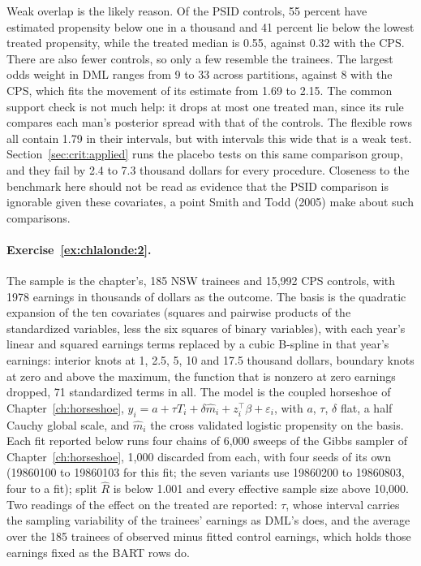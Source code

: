 Weak overlap is the likely reason. Of the PSID controls, 55 percent have estimated propensity below one in a thousand and 41 percent lie below the lowest treated propensity, while the treated median is 0.55, against 0.32 with the CPS. There are also fewer controls, so only a few resemble the trainees. The largest odds weight in DML ranges from 9 to 33 across partitions, against 8 with the CPS, which fits the movement of its estimate from 1.69 to 2.15. The common support check is not much help: it drops at most one treated man, since its rule compares each man's posterior spread with that of the controls. The flexible rows all contain 1.79 in their intervals, but with intervals this wide that is a weak test. Section~\ref{sec:crit:applied} runs the placebo tests on this same comparison group, and they fail by 2.4 to 7.3 thousand dollars for every procedure. Closeness to the benchmark here should not be read as evidence that the PSID comparison is ignorable given these covariates, a point Smith and Todd (2005) make about such comparisons.

\paragraph{Exercise~\ref{ex:chlalonde:2}.} The sample is the chapter's, 185 NSW trainees and 15,992 CPS controls, with 1978 earnings in thousands of dollars as the outcome. The basis is the quadratic expansion of the ten covariates (squares and pairwise products of the standardized variables, less the six squares of binary variables), with each year's linear and squared earnings terms replaced by a cubic B-spline in that year's earnings: interior knots at 1, 2.5, 5, 10 and 17.5 thousand dollars, boundary knots at zero and above the maximum, the function that is nonzero at zero earnings dropped, 71 standardized terms in all. The model is the coupled horseshoe of Chapter~\ref{ch:horseshoe}, $y_i = a + \tau T_i + \delta\hat m_i + z_i^\top\beta + \varepsilon_i$, with $a$, $\tau$, $\delta$ flat, a half Cauchy global scale, and $\hat m_i$ the cross validated logistic propensity on the basis. Each fit reported below runs four chains of 6,000 sweeps of the Gibbs sampler of Chapter~\ref{ch:horseshoe}, 1,000 discarded from each, with four seeds of its own (19860100 to 19860103 for this fit; the seven variants use 19860200 to 19860803, four to a fit); split $\hat R$ is below 1.001 and every effective sample size above 10,000. Two readings of the effect on the treated are reported: $\tau$, whose interval carries the sampling variability of the trainees' earnings as DML's does, and the average over the 185 trainees of observed minus fitted control earnings, which holds those earnings fixed as the BART rows do.

